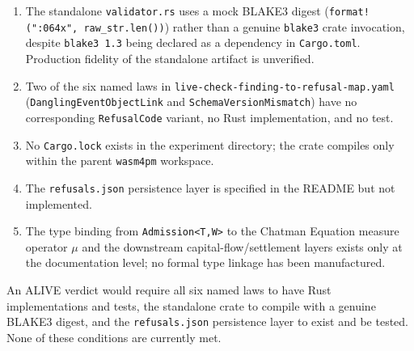 \begin{enumerate}
  \item The standalone \texttt{validator.rs} uses a mock BLAKE3 digest
        (\texttt{format!("{:064x}", raw\_str.len())}) rather than a genuine
        \texttt{blake3} crate invocation, despite \texttt{blake3 1.3} being declared
        as a dependency in \texttt{Cargo.toml}. Production fidelity of the standalone
        artifact is unverified.
  \item Two of the six named laws in \texttt{live-check-finding-to-refusal-map.yaml}
        (\texttt{DanglingEventObjectLink} and \texttt{SchemaVersionMismatch}) have no
        corresponding \texttt{RefusalCode} variant, no Rust implementation, and no test.
  \item No \texttt{Cargo.lock} exists in the experiment directory; the crate compiles
        only within the parent \texttt{wasm4pm} workspace.
  \item The \texttt{refusals.json} persistence layer is specified in the README but
        not implemented.
  \item The type binding from \texttt{Admission<T,W>} to the Chatman Equation measure
        operator $\mu$ and the downstream capital-flow/settlement layers exists only
        at the documentation level; no formal type linkage has been manufactured.
\end{enumerate}

An ALIVE verdict would require all six named laws to have Rust implementations and
tests, the standalone crate to compile with a genuine BLAKE3 digest, and the
\texttt{refusals.json} persistence layer to exist and be tested. None of these
conditions are currently met.
